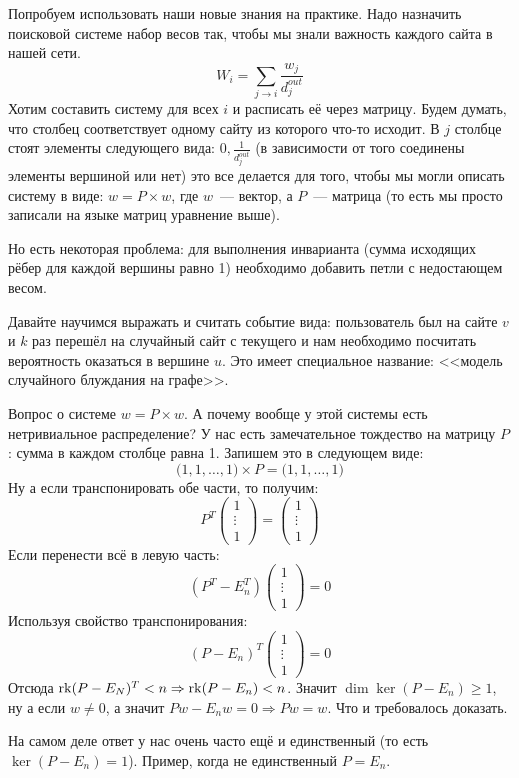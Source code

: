 \begin{example}
    \label{fix:pagerank}
    Попробуем использовать наши новые знания на практике.
    Надо назначить поисковой системе набор весов так, чтобы
    мы знали важность каждого сайта в нашей сети.
    $$W_i = \sum_{j\rightarrow i} \frac{w_j}{d_j^{out}}$$
    Хотим составить систему для всех $i$ и расписать
    её через матрицу. Будем думать, что столбец соответствует
    одному сайту из которого что-то исходит. В $j$ столбце
    стоят элементы следующего вида: $0, \frac{1}{d^{out}_j}$
    (в зависимости от того соединены элементы вершиной или нет)
    это все делается для того, чтобы мы могли описать систему
    в виде: $w = P\times w$, где $w$~--- вектор, а $P$~--- матрица
    (то есть мы просто записали на языке матриц уравнение выше).

    Но есть некоторая проблема: для выполнения инварианта
    (сумма исходящих рёбер для каждой вершины равно 1) необходимо
    добавить петли с недостающем весом.

    Давайте научимся выражать и считать событие вида: 
    пользователь был на сайте $v$ и $k$ раз перешёл на случайный
    сайт с текущего и нам необходимо посчитать вероятность
    оказаться в вершине $u$. Это имеет специальное название:
    <<модель случайного блуждания на графе>>. 

    Вопрос о системе $w = P\times w$. А почему вообще у этой
    системы есть нетривиальное распределение? У нас есть
    замечательное тождество на матрицу $P$: сумма в каждом
    столбце равна 1. Запишем это в следующем виде:
    $$\big(1,1,\dots, 1\big)\times P = \big(1,1,\dots, 1\big)$$
    Ну а если транспонировать обе части, то получим:
    $$
    P^T\begin{pmatrix}
        1\\\vdots\\1
    \end{pmatrix} = 
    \begin{pmatrix}
        1\\\vdots\\1
    \end{pmatrix}
    $$
    Если перенести всё в левую часть:
    $$
    (P^T - E_n^T)\begin{pmatrix}
        1\\\vdots\\1
    \end{pmatrix} = 0
    $$
    Используя свойство транспонирования:
    $$
    (P - E_n)^T\begin{pmatrix}
        1\\\vdots\\1
    \end{pmatrix} = 0
    $$
    Отсюда $\operatorname{rk}(P - E_N)^T<n \Rightarrow \operatorname{rk}(P - E_n)<n$.
    Значит $\dim \ker(P - E_n) \ge 1$, ну а если $w\not=0$,
    а значит $Pw -  E_nw = 0\Rightarrow Pw = w$.
    Что и требовалось доказать.

    На самом деле ответ у нас очень часто ещё и единственный
    (то есть $\ker(P-E_n)=1$). Пример, когда не единственный $P = E_n$.
\end{example}
